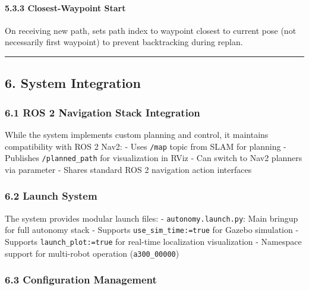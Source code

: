 \hypertarget{closest-waypoint-start}{%
\paragraph{5.3.3 Closest-Waypoint Start}\label{closest-waypoint-start}}

On receiving new path, sets path index to waypoint closest to current
pose (not necessarily first waypoint) to prevent backtracking during
replan.

\begin{center}\rule{0.5\linewidth}{0.5pt}\end{center}

\hypertarget{system-integration}{%
\subsection{6. System Integration}\label{system-integration}}

\hypertarget{ros-2-navigation-stack-integration}{%
\subsubsection{6.1 ROS 2 Navigation Stack
Integration}\label{ros-2-navigation-stack-integration}}

While the system implements custom planning and control, it maintains
compatibility with ROS 2 Nav2: - Uses \texttt{/map} topic from SLAM for
planning - Publishes \texttt{/planned\_path} for visualization in RViz -
Can switch to Nav2 planners via parameter - Shares standard ROS 2
navigation action interfaces

\hypertarget{launch-system}{%
\subsubsection{6.2 Launch System}\label{launch-system}}

The system provides modular launch files: - \texttt{autonomy.launch.py}:
Main bringup for full autonomy stack - Supports
\texttt{use\_sim\_time:=true} for Gazebo simulation - Supports
\texttt{launch\_plot:=true} for real-time localization visualization -
Namespace support for multi-robot operation (\texttt{a300\_00000})

\hypertarget{configuration-management}{%
\subsubsection{6.3 Configuration
Management}\label{configuration-management}}

